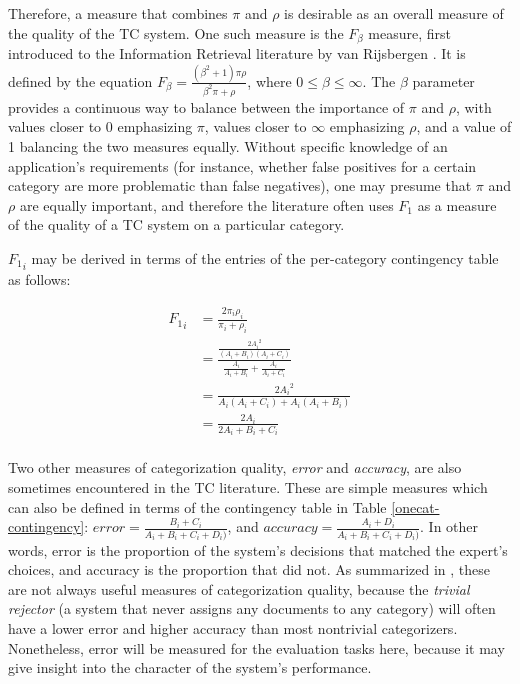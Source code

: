 Therefore, a measure that combines $\pi$ and $\rho$ is desirable as an
overall measure of the quality of the TC system.  One such measure is
the $F_\beta$ measure, first introduced to the Information Retrieval
literature by van Rijsbergen \cite[ch. 7]{rijsbergen:79}.  It is
defined by the equation $F_\beta = \frac{(\beta^2 + 1)\pi\rho}{\beta^2
\pi + \rho}$, where $0 \leq \beta \leq \infty$.  The $\beta$ parameter
provides a continuous way to balance between the importance of $\pi$
and $\rho$, with values closer to 0 emphasizing $\pi$, values closer
to $\infty$ emphasizing $\rho$, and a value of 1 balancing the two
measures equally.  Without specific knowledge of an application's
requirements (for instance, whether false positives for a certain
category are more problematic than false negatives), one may presume
that $\pi$ and $\rho$ are equally important, and therefore the
literature often uses $F_1$ as a measure of the quality of a TC system
on a particular category.

${F_1}_i$ may be derived in terms of the entries of the per-category
contingency table as follows:

\begin{equation*}
\begin{split}
{F_1}_i 
 & = \frac{ 2 \pi_i \rho_i}{\pi_i + \rho_i} \\[6pt]
 & = \frac{ \frac{2 {A_i}^2}{(A_i+B_i)(A_i+C_i)} } { \frac{A_i}{A_i+B_i} + \frac{A_i}{A_i+C_i} } \\[6pt]
 & = \frac{ 2 {A_i}^2 }                            { A_i(A_i+C_i) + A_i(A_i+B_i) } \\[6pt]
 & = \frac{ 2 A_i }                                { 2 A_i + B_i + C_i } \\[6pt]
\end{split}
\end{equation*}

Two other measures of categorization quality, \emph{error} and
\emph{accuracy}, are also sometimes encountered in the TC literature.
These are simple measures which can also be defined in terms of the
contingency table in Table \ref{onecat-contingency}: $error =
\frac{B_i+C_i}{A_i+B_i+C_i+D_i)}$, and $accuracy =
\frac{A_i+D_i}{A_i+B_i+C_i+D_i)}$.  In other words, error is the
proportion of the system's decisions that matched the expert's
choices, and accuracy is the proportion that did not.  As summarized
in \cite[p. 34]{sebastiani:02}, these are not always useful measures
of categorization quality, because the \emph{trivial rejector} (a
system that never assigns any documents to any category) will often
have a lower error and higher accuracy than most nontrivial
categorizers.  Nonetheless, error will be measured for the evaluation
tasks here, because it may give insight into the character of the
system's performance.


